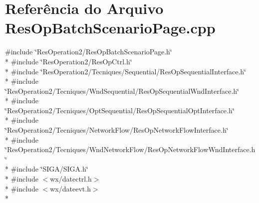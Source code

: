 \section{Referência do Arquivo Res\+Op\+Batch\+Scenario\+Page.\+cpp}
\label{_res_op_batch_scenario_page_8cpp}
{\ttfamily \#include \char`\"{}Res\+Operation2/\+Res\+Op\+Batch\+Scenario\+Page.\+h\char`\"{}}\\*
{\ttfamily \#include \char`\"{}Res\+Operation2/\+Res\+Op\+Ctrl.\+h\char`\"{}}\\*
{\ttfamily \#include \char`\"{}Res\+Operation2/\+Tecniques/\+Sequential/\+Res\+Op\+Sequential\+Interface.\+h\char`\"{}}\\*
{\ttfamily \#include \char`\"{}Res\+Operation2/\+Tecniques/\+Wnd\+Sequential/\+Res\+Op\+Sequential\+Wnd\+Interface.\+h\char`\"{}}\\*
{\ttfamily \#include \char`\"{}Res\+Operation2/\+Tecniques/\+Opt\+Sequential/\+Res\+Op\+Sequential\+Opt\+Interface.\+h\char`\"{}}\\*
{\ttfamily \#include \char`\"{}Res\+Operation2/\+Tecniques/\+Network\+Flow/\+Res\+Op\+Network\+Flow\+Interface.\+h\char`\"{}}\\*
{\ttfamily \#include \char`\"{}Res\+Operation2/\+Tecniques/\+Wnd\+Network\+Flow/\+Res\+Op\+Network\+Flow\+Wnd\+Interface.\+h\char`\"{}}\\*
{\ttfamily \#include \char`\"{}S\+I\+G\+A/\+S\+I\+G\+A.\+h\char`\"{}}\\*
{\ttfamily \#include $<$wx/datectrl.\+h$>$}\\*
{\ttfamily \#include $<$wx/dateevt.\+h$>$}\\*
